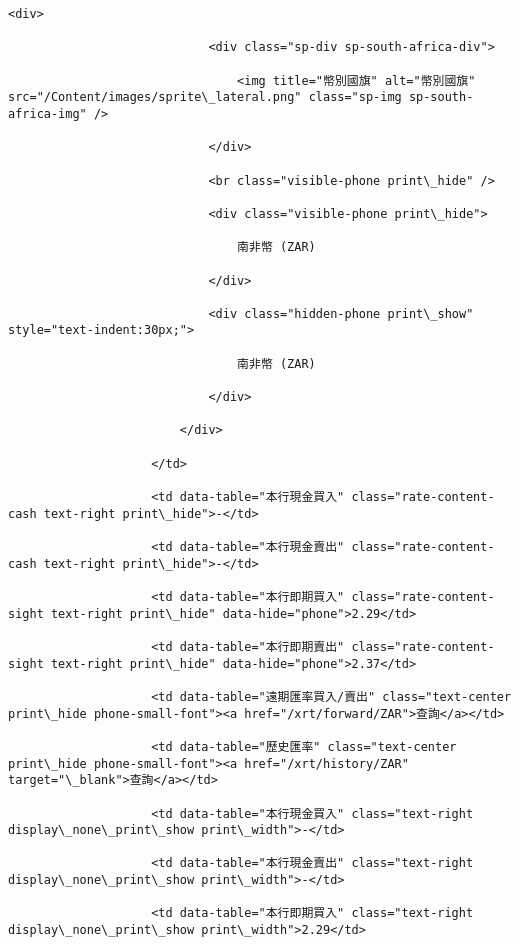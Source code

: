 \documentclass[11pt]{article}
\begin{document}
\begin{Verbatim}[commandchars=\\\{\}]
                        <div>

                            <div class="sp-div sp-south-africa-div">

                                <img title="幣別國旗" alt="幣別國旗" src="/Content/images/sprite\_lateral.png" class="sp-img sp-south-africa-img" />

                            </div>

                            <br class="visible-phone print\_hide" />

                            <div class="visible-phone print\_hide">

                                南非幣 (ZAR)

                            </div>

                            <div class="hidden-phone print\_show" style="text-indent:30px;">

                                南非幣 (ZAR)

                            </div>

                        </div>

                    </td>

                    <td data-table="本行現金買入" class="rate-content-cash text-right print\_hide">-</td>

                    <td data-table="本行現金賣出" class="rate-content-cash text-right print\_hide">-</td>

                    <td data-table="本行即期買入" class="rate-content-sight text-right print\_hide" data-hide="phone">2.29</td>

                    <td data-table="本行即期賣出" class="rate-content-sight text-right print\_hide" data-hide="phone">2.37</td>

                    <td data-table="遠期匯率買入/賣出" class="text-center print\_hide phone-small-font"><a href="/xrt/forward/ZAR">查詢</a></td>

                    <td data-table="歷史匯率" class="text-center print\_hide phone-small-font"><a href="/xrt/history/ZAR" target="\_blank">查詢</a></td>

                    <td data-table="本行現金買入" class="text-right display\_none\_print\_show print\_width">-</td>

                    <td data-table="本行現金賣出" class="text-right display\_none\_print\_show print\_width">-</td>

                    <td data-table="本行即期買入" class="text-right display\_none\_print\_show print\_width">2.29</td>


\end{Verbatim}
\end{document}
